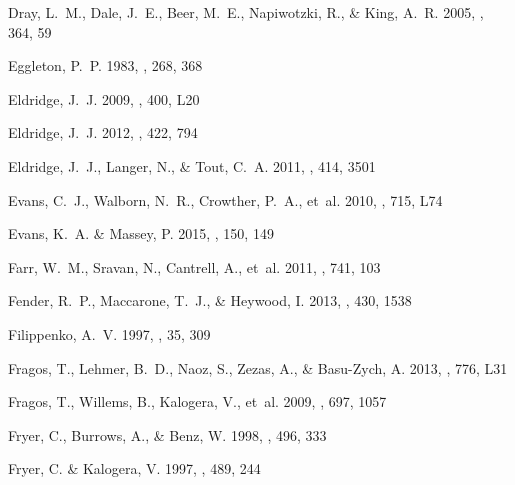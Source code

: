 \documentclass{aa}
\begin{document}
\begin{thebibliography}{242}
{Dray}, L.~M., {Dale}, J.~E., {Beer}, M.~E., {Napiwotzki}, R., \& {King}, A.~R.
  2005, \mnras, 364, 59

{Eggleton}, P.~P. 1983, \apj, 268, 368

{Eldridge}, J.~J. 2009, \mnras, 400, L20

{Eldridge}, J.~J. 2012, \mnras, 422, 794

{Eldridge}, J.~J., {Langer}, N., \& {Tout}, C.~A. 2011, \mnras, 414, 3501

{Evans}, C.~J., {Walborn}, N.~R., {Crowther}, P.~A., {et~al.} 2010, \apjl, 715,
  L74

{Evans}, K.~A. \& {Massey}, P. 2015, \aj, 150, 149

{Farr}, W.~M., {Sravan}, N., {Cantrell}, A., {et~al.} 2011, \apj, 741, 103

{Fender}, R.~P., {Maccarone}, T.~J., \& {Heywood}, I. 2013, \mnras, 430, 1538

{Filippenko}, A.~V. 1997, \araa, 35, 309

{Fragos}, T., {Lehmer}, B.~D., {Naoz}, S., {Zezas}, A., \& {Basu-Zych}, A.
  2013, \apjl, 776, L31

{Fragos}, T., {Willems}, B., {Kalogera}, V., {et~al.} 2009, \apj, 697, 1057

{Fryer}, C., {Burrows}, A., \& {Benz}, W. 1998, \apj, 496, 333

{Fryer}, C. \& {Kalogera}, V. 1997, \apj, 489, 244


\end{thebibliography}
\end{document}
